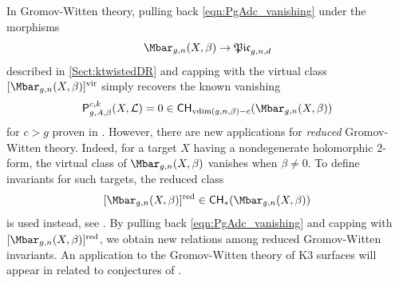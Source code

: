 \documentclass[a4paper,12pt]{article} %
\newcommand{\ca}[1]{{\mathcal{#1}}}
\def\P{\mathsf{P}}
\theoremstyle{definition}
\theoremstyle{plain}%
\newcommand{\MbarX}{\Mbar_{g,n}(X, \beta)}
\newcommand{\vdim}{\mathrm{vdim}}
\newcommand{\Picabs}{\mathfrak{Pic}}
\newcommand{\Chow}{\mathsf{CH}}
\begin{document}
In Gromov-Witten theory,  pulling back \eqref{eqn:PgAdc_vanishing} under the morphisms $$\MbarX \to \Picabs_{g,n,d}$$ described in  \cref{Sect:ktwistedDR} and capping with the virtual class $[\MbarX]^\textup{vir}$ simply recovers the known vanishing 
\begin{equation} \label{eqn:PXbetavanishing}
    \P_{g,A,\beta}^{c,k}(X,\ca L) = 0 \in \Chow_{\vdim(g,n,\beta)-c}(\MbarX)
\end{equation}
for $c>g$ proven in \cite{Bae}. However, there are new applications for \emph{reduced} Gromov-Witten theory. Indeed, for a target $X$ having a nondegenerate holomorphic $2$-form, the virtual class of $\MbarX$ vanishes when $\beta \neq 0$.
To define invariants for such targets, the reduced class
\[[\MbarX]^\textup{red} \in \Chow_{*}(\MbarX)\]
is used instead, see \cite{bryanleung, maulikpandharipande}. By 
pulling back \eqref{eqn:PgAdc_vanishing} and capping with $[\MbarX]^\textup{red}$, we obtain new relations among reduced Gromov-Witten invariants. An application to the Gromov-Witten theory of K3 surfaces will appear in \cite{BaeBuelles} related to 
conjectures of \cite{ObPand}.





 




%
\end{document}

